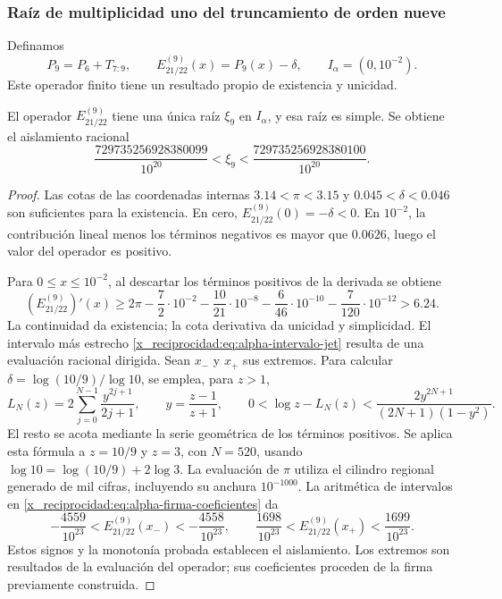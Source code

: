 \subsubsection{Raíz de multiplicidad uno del truncamiento de orden nueve}
\label{x_reciprocidad:subsec:alpha-jet}

Definamos
\[
 P_9=P_6+T_{7:9},\qquad E_{21/22}^{(9)}(x)=P_9(x)-\delta,
 \qquad I_\alpha=(0,10^{-2}).
\]
Este operador finito tiene un resultado propio de existencia y unicidad.

\begin{proposition}
\label{x_reciprocidad:prop:alpha-raiz-jet}
El operador \(E_{21/22}^{(9)}\) tiene una única raíz
\(\xi_9\) en \(I_\alpha\), y esa raíz es simple. Se obtiene el aislamiento racional
\begin{equation}
 \frac{729735256928380099}{10^{20}}
 <\xi_9<\frac{729735256928380100}{10^{20}}.
 \label{x_reciprocidad:eq:alpha-intervalo-jet}
\end{equation}
\end{proposition}

\begin{proof}
Las cotas de las coordenadas internas
\(3.14<\pi<3.15\) y
\(0.045<\delta<0.046\) son suficientes para la existencia. En cero,
\(E_{21/22}^{(9)}(0)=-\delta<0\). En \(10^{-2}\), la contribución
lineal menos los términos negativos es mayor que \(0.0626\), luego el
valor del operador es positivo.

Para \(0\leq x\leq10^{-2}\), al descartar los términos positivos de
la derivada se obtiene
\[
 (E_{21/22}^{(9)})'(x)
 \geq2\pi-\frac72\cdot10^{-2}
 -\frac{10}{21}\cdot10^{-8}-\frac6{46}\cdot10^{-10}
 -\frac7{120}\cdot10^{-12}>6.24.
\]
La continuidad da existencia; la cota derivativa da unicidad y
simplicidad. El intervalo más estrecho
\eqref{x_reciprocidad:eq:alpha-intervalo-jet} resulta de una evaluación racional dirigida.
Sean \(x_-\) y \(x_+\) sus extremos. Para calcular
\(\delta=\log(10/9)/\log 10\), se emplea, para \(z>1\),
\[
 L_N(z)=2\sum_{j=0}^{N-1}\frac{y^{2j+1}}{2j+1},\qquad
 y=\frac{z-1}{z+1},\qquad
 0<\log z-L_N(z)<\frac{2y^{2N+1}}{(2N+1)(1-y^2)}.
\]
El resto se acota mediante la serie geométrica de los términos positivos.
Se aplica esta fórmula a \(z=10/9\) y \(z=3\), con \(N=520\),
usando \(\log 10=\log(10/9)+2\log3\). La evaluación de
\(\pi\) utiliza el cilindro regional generado de mil cifras, incluyendo
su anchura \(10^{-1000}\). La aritmética de intervalos en
\eqref{x_reciprocidad:eq:alpha-firma-coeficientes} da
\[
 -\frac{4559}{10^{23}}<E_{21/22}^{(9)}(x_-)< -\frac{4558}{10^{23}},
 \qquad
 \frac{1698}{10^{23}}<E_{21/22}^{(9)}(x_+)<\frac{1699}{10^{23}}.
\]
Estos signos y la monotonía probada establecen el aislamiento. Los extremos
son resultados de la evaluación del operador; sus coeficientes proceden de
la firma previamente construida.
\end{proof}

